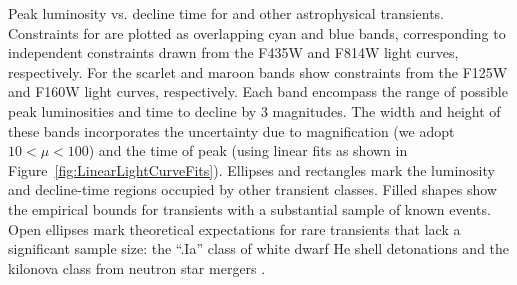 Peak luminosity vs. decline time for \spock and other astrophysical
transients.  Constraints for \spockone are plotted as overlapping cyan
and blue bands, corresponding to independent constraints drawn from
the F435W and F814W light curves, respectively.  For \spocktwo the
scarlet and maroon bands show constraints from the F125W and F160W
light curves, respectively.  Each band encompass the range of possible
peak luminosities and time to decline by 3 magnitudes. The width and
height of these bands incorporates the uncertainty due to
magnification (we adopt $10<\mu<100$) and the time of peak (using
linear fits as shown in Figure~\ref{fig:LinearLightCurveFits}).
Ellipses and rectangles mark the luminosity and decline-time regions
occupied by other transient classes.  Filled shapes show the empirical
bounds for transients with a substantial sample of known events. Open
ellipses mark theoretical expectations for rare transients that lack a
significant sample size: the ``.Ia'' class of white dwarf He shell
detonations \citep{Bildsten:2007,Shen:2010} and the kilonova class
from neutron star
mergers \citep{Kulkarni:2005,Tanvir:2013,Kasen:2015}.
\label{fig:PeakLuminosityDeclineTimeWide}
